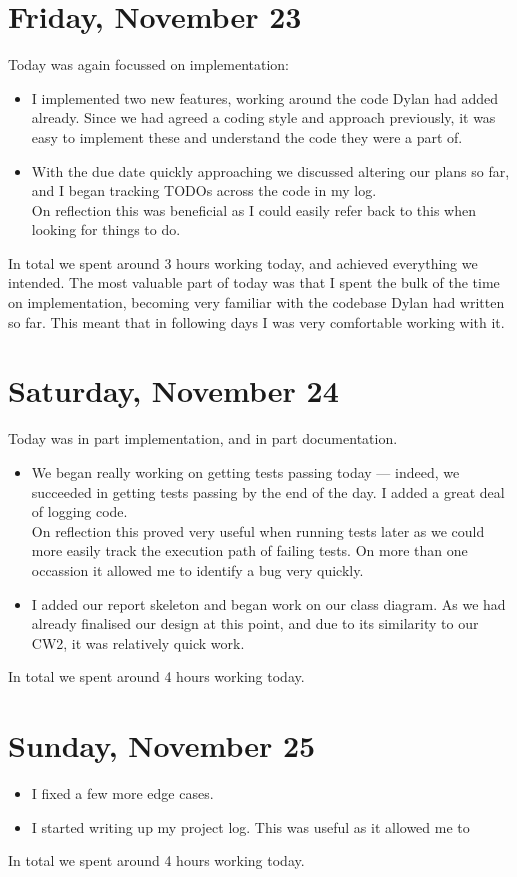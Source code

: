 \documentclass[titlepage, 12pt]{extarticle}
\begin{document}
\section{Friday, November 23}
Today was again focussed on implementation:
\begin{itemize}
\item I implemented two new features, working around the code Dylan had added already. Since we had agreed a coding style and approach previously, it was easy to implement these and understand the code they were a part of. 
\item With the due date quickly approaching we discussed altering our plans so far, and I began tracking TODOs across the code in my log. \\ On reflection this was beneficial as I could easily refer back to this when looking for things to do. 
\end{itemize}
In total we spent around 3 hours working today, and achieved everything we intended. The most valuable part of today was that I spent the bulk of the time on implementation, becoming very familiar with the codebase Dylan had written so far. This meant that in following days I was very comfortable working with it.

\section{Saturday, November 24}
Today was in part implementation, and in part documentation.

\begin{itemize}
\item We began really working on getting tests passing today --- indeed, we succeeded in getting tests passing by the end of the day. I added a great deal of logging code. \\ On reflection this proved very useful when running tests later as we could more easily track the execution path of failing tests. On more than one occassion it allowed me to identify a bug very quickly. 
\item I added our report skeleton and began work on our class diagram. As we had already finalised our design at this point, and due to its similarity to our CW2, it was relatively quick work.
\end{itemize}

In total we spent around 4 hours working today. 
\section{Sunday, November 25}
\begin{itemize}
  \item I fixed a few more edge cases.
  \item I started writing up my project log. This was useful as it allowed me to 
\end{itemize}
In total we spent around 4 hours working today.
\end{document}
